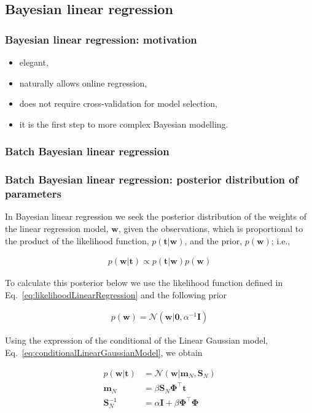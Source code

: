 \documentclass[11pt]{beamer}
\begin{document}
\subsection{Bayesian linear regression}

\begin{frame}
    \frametitle{Bayesian linear regression: motivation}

	\begin{itemize}
		\item elegant,
		\item naturally allows online regression,
		\item does not require cross-validation for model selection,
		\item it is the first step to more complex Bayesian modelling.
	\end{itemize}

\end{frame}

\subsubsection{Batch Bayesian linear regression}

\begin{frame}
    \frametitle{Batch Bayesian linear regression: posterior distribution of parameters}

	\scriptsize
	In Bayesian linear regression we seek the posterior distribution of the
weights of the linear regression model, $\mathbf{w}$, given the observations, which
is proportional to the product of the likelihood function,
$p(\mathbf{t}|\mathbf{w})$, and the prior, $p(\mathbf{w})$; i.e., 

	\begin{align}
		p(\mathbf{w}|\mathbf{t})\propto
        p(\mathbf{t}|\mathbf{w})p(\mathbf{w})\label{eq:priorLinearRegression}
	\end{align}

	To calculate this posterior below we use the likelihood function defined in
Eq.~\ref{eq:likelihoodLinearRegression} and the following prior

	\begin{align*}
		p(\mathbf{w})=\mathcal{N}(\mathbf{w}|\mathbf{0},\alpha^{-1}\mathbf{I})
	\end{align*}

	Using the expression of the conditional of the Linear Gaussian model,
Eq.~\ref{eq:conditionalLinearGaussianModel}, we obtain

	\begin{align}
		p(\mathbf{w}|\mathbf{t})&=\mathcal{N}(\mathbf{w}|\mathbf{m}_N,\mathbf{S}_N)\nonumber\\
		\mathbf{m}_N&=\beta\mathbf{S}_N\boldsymbol{\Phi}^\intercal\mathbf{t}\label{eq:blrPosteriorMean}\\
		\mathbf{S}_N^{-1}&=\alpha\mathbf{I}+\beta\boldsymbol{\Phi}^\intercal\boldsymbol{\Phi}\label{eq:blrPosteriorCov}
	\end{align}

	\normalsize
\end{frame}
\end{document}
